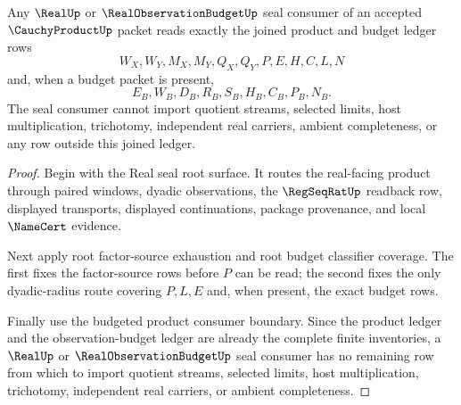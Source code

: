 \begin{theorem}
\label{thm:cauchy-product-root-seal-ledger-exactness}
Any $\RealUp$ or $\RealObservationBudgetUp$ seal consumer of an accepted $\CauchyProductUp$ packet reads exactly the joined product and budget ledger rows
$$
W_X,W_Y,M_X,M_Y,Q_X,Q_Y,P,E,H,C,L,N
$$
and, when a budget packet is present,
$$
E_B,W_B,D_B,R_B,S_B,H_B,C_B,P_B,N_B.
$$
The seal consumer cannot import quotient streams, selected limits, host multiplication, trichotomy, independent real carriers, ambient completeness, or any row outside this joined ledger.
\end{theorem}
\begin{proof}
Begin with the Real seal root surface. It routes the real-facing product through paired windows, dyadic observations, the $\RegSeqRatUp$ readback row, displayed transports, displayed continuations, package provenance, and local $\NameCert$ evidence.

Next apply root factor-source exhaustion and root budget classifier coverage. The first fixes the factor-source rows before $P$ can be read; the second fixes the only dyadic-radius route covering $P,L,E$ and, when present, the exact budget rows.

Finally use the budgeted product consumer boundary. Since the product ledger and the observation-budget ledger are already the complete finite inventories, a $\RealUp$ or $\RealObservationBudgetUp$ seal consumer has no remaining row from which to import quotient streams, selected limits, host multiplication, trichotomy, independent real carriers, or ambient completeness.
\end{proof}

